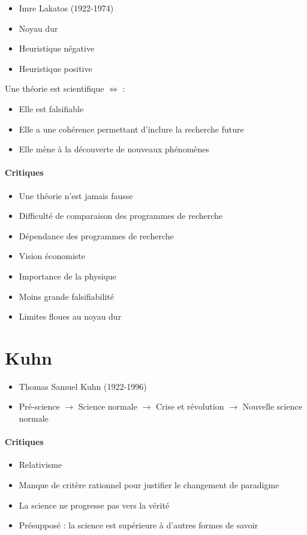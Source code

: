 \documentclass[fleqn,letterpaper, 12pt]{article}
\begin{document}
	\begin{itemize}
		\item Imre Lakatos (1922-1974)
		\item Noyau dur
		\item Heuristique négative
		\item Heuristique positive
	\end{itemize}

	Une théorie est scientifique $\Leftrightarrow$ :
	\begin{itemize}
		\item Elle est falsifiable
		\item Elle a une cohérence permettant d'inclure la recherche future
		\item Elle mène à la découverte de nouveaux phénomènes
	\end{itemize}
	
	\paragraph{Critiques}
	\begin{itemize}
		\item Une théorie n'est jamais fausse
		\item Difficulté de comparaison des programmes de recherche
		\item Dépendance des programmes de recherche
		\item Vision économiste
		\item Importance de la physique
		\item Moins grande falsifiabilité
		\item Limites floues au noyau dur
	\end{itemize}

	\section{Kuhn}
	
	\begin{itemize}
		\item Thomas Samuel Kuhn (1922-1996)
		\item Pré-science $\rightarrow$ Science normale $\rightarrow$ Crise et révolution $\rightarrow$ Nouvelle science normale
	\end{itemize}

	\paragraph{Critiques}
	\begin{itemize}
		\item Relativisme
		\item Manque de critère rationnel pour justifier le changement de paradigme
		\item La science ne progresse pas vers la vérité
		\item Présupposé : la science est supérieure à d'autres formes de savoir
	\end{itemize}
	
\end{document}
